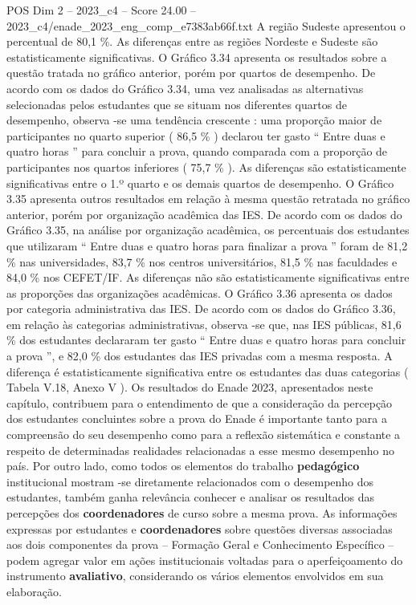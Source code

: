 \begin{textsample}{POS Dim 2 – 2023\_c4 – Score 24.00 – 2023\_c4/enade\_2023\_eng\_comp\_e7383ab66f.txt}
A região Sudeste apresentou o percentual de 80,1 \%.
As diferenças entre as regiões Nordeste e Sudeste são estatisticamente significativas.
O Gráfico 3.34 apresenta os resultados sobre a questão tratada no gráfico anterior, porém por quartos de desempenho.
De acordo com os dados do Gráfico 3.34, uma vez analisadas as alternativas selecionadas pelos estudantes que se situam nos diferentes quartos de desempenho, observa -se uma tendência crescente : uma proporção maior de participantes no quarto superior ( 86,5 \% ) declarou ter gasto “ Entre duas e quatro horas ” para concluir a prova, quando comparada com a proporção de participantes nos quartos inferiores ( 75,7 \% ).
As diferenças são estatisticamente significativas entre o 1.º quarto e os demais quartos de desempenho.
O Gráfico 3.35 apresenta outros resultados em relação à mesma questão retratada no gráfico anterior, porém por organização acadêmica das IES.
De acordo com os dados do Gráfico 3.35, na análise por organização acadêmica, os percentuais dos estudantes que utilizaram “ Entre duas e quatro horas para finalizar a prova ” foram de 81,2 \% nas universidades, 83,7 \% nos centros universitários, 81,5 \% nas faculdades e 84,0 \% nos CEFET/IF.
As diferenças não são estatisticamente significativas entre as proporções das organizações acadêmicas.
O Gráfico 3.36 apresenta os dados por categoria administrativa das IES.
De acordo com os dados do Gráfico 3.36, em relação às categorias administrativas, observa -se que, nas IES públicas, 81,6 \% dos estudantes declararam ter gasto “ Entre duas e quatro horas para concluir a prova ”, e 82,0 \% dos estudantes das IES privadas com a mesma resposta.
A diferença é estatisticamente significativa entre os estudantes das duas categorias ( Tabela V.18, Anexo V ).
Os resultados do Enade 2023, apresentados neste capítulo, contribuem para o entendimento de que a consideração da percepção dos estudantes concluintes sobre a prova do Enade é importante tanto para a compreensão do seu desempenho como para a reflexão sistemática e constante a respeito de determinadas realidades relacionadas a esse mesmo desempenho no país.
Por outro lado, como todos os elementos do trabalho \textbf{pedagógico} institucional mostram -se diretamente relacionados com o desempenho dos estudantes, também ganha relevância conhecer e analisar os resultados das percepções dos \textbf{coordenadores} de curso sobre a mesma prova.
As informações expressas por estudantes e \textbf{coordenadores} sobre questões diversas associadas aos dois componentes da prova – Formação Geral e Conhecimento Específico – podem agregar valor em ações institucionais voltadas para o aperfeiçoamento do instrumento \textbf{avaliativo}, considerando os vários elementos envolvidos em sua elaboração.

\end{textsample}
